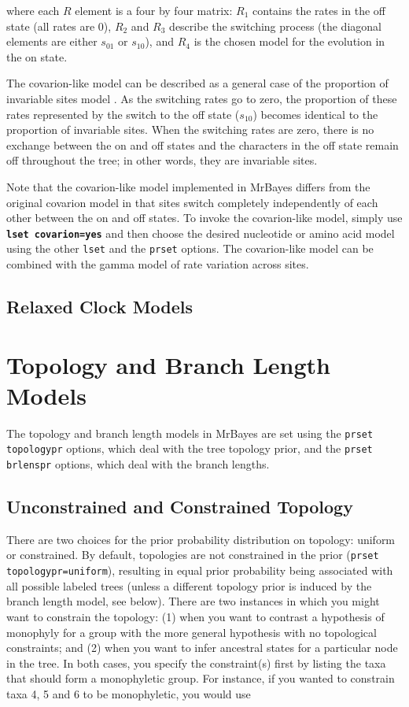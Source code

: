 \documentclass[12pt]{book}
\newcommand{\ttt}[1]{\texttt{#1}}
\newcommand{\tb}[1]{\ttt{\textbf{#1}}}
\begin{document}
where each $R$ element is a four by four matrix: $R_1$ contains the rates in the off state (all
rates are 0), $R_2$ and $R_3$ describe the switching process (the diagonal elements are either
$s_{01}$ or $s_{10}$), and $R_4$ is the chosen model for the evolution in the on state.

The covarion-like model can be described as a general case of the proportion of invariable sites
model \citep{huelsenbeck02a}. As the switching rates go to zero, the proportion of these rates
represented by the switch to the off state ($s_10$) becomes identical to the proportion of
invariable sites. When the switching rates are zero, there is no exchange between the on and off
states and the characters in the off state remain off throughout the tree; in other words, they are
invariable sites.

Note that the covarion-like model implemented in MrBayes differs from the original covarion model
in that sites switch completely independently of each other between the on and off states. To
invoke the covarion-like model, simply use \tb{lset covarion=yes} and then choose the desired
nucleotide or amino acid model using the other \ttt{lset} and the \ttt{prset} options. The
covarion-like model can be combined with the gamma model of rate variation across sites.

\subsection{Relaxed Clock Models}

\section{Topology and Branch Length Models}
The topology and branch length models in MrBayes are set using the \ttt{prset topologypr} options,
which deal with the tree topology prior, and the \ttt{prset brlenspr} options, which deal with the
branch lengths.

\subsection{Unconstrained and Constrained Topology}
There are two choices for the prior probability distribution on topology: uniform or constrained.
By default, topologies are not constrained in the prior (\ttt{prset topologypr=uniform}), resulting
in equal prior probability being associated with all possible labeled trees (unless a different
topology prior is induced by the branch length model, see below). There are two instances in which
you might want to constrain the topology: (1) when you want to contrast a hypothesis of monophyly
for a group with the more general hypothesis with no topological constraints; and (2) when you want
to infer ancestral states for a particular node in the tree. In both cases, you specify the
constraint(s) first by listing the taxa that should form a monophyletic group. For instance, if you
wanted to constrain taxa 4, 5 and 6 to be monophyletic, you would use
\end{document}
